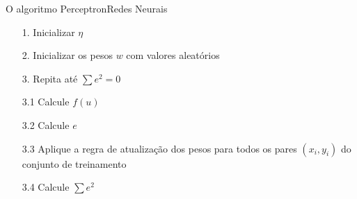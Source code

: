 \documentclass[t]{beamer}
\begin{document}
\begin{ftst}{O algoritmo Perceptron}{Redes Neurais}
\begin{itemize}
    \item[1.] Inicializar $\eta$
    \item[2.] Inicializar os pesos $w$ com valores aleatórios
    \item[3.] Repita até $\sum e^2 = 0$
    
    \setlength{\leftskip}{1cm}
        \item[3.1] Calcule $f(u)$
        \item[3.2] Calcule $e$
        \item[3.3] Aplique a regra de atualização dos pesos para todos os pares $(x_i,y_i)$ do conjunto de treinamento
        \item[3.4] Calcule $\sum e^2$

\end{itemize}


\end{ftst}

\end{document}
